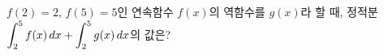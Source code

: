 $f(2)=2$, $f(5)=5$인 연속함수 $f(x)$의 역함수를 $g(x)$라 할 때, 정적분 $\displaystyle\int_{2}^{5} f(x)\mkern3mu dx+\int_{2}^{5} g(x)\mkern3mu dx$의 값은?
